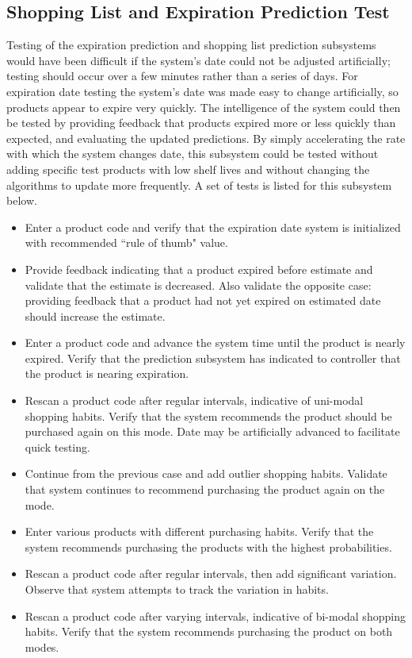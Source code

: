 \documentclass[11pt]{article} %
\begin{document}
\subsection{Shopping List and Expiration Prediction Test}
Testing of the expiration prediction and shopping list prediction subsystems would have been difficult if the system's date could not be adjusted artificially; testing should occur over a few minutes rather than a series of days. For expiration date testing the system's date was made easy to change artificially, so products appear to expire very quickly. The intelligence of the system could then be tested by providing feedback that products expired more or less quickly than expected, and evaluating the updated predictions. By simply accelerating the rate with which the system changes date, this subsystem could be tested without adding specific test products with low shelf lives and without changing the algorithms to update more frequently. A set of tests is listed for this subsystem below.
\begin{itemize}
\item Enter a product code and verify that the expiration date system is initialized with recommended ``rule of thumb" value.
\item Provide feedback indicating that a product expired before estimate and validate that the estimate is decreased. Also validate the opposite case: providing feedback that a product had not yet expired on estimated date should increase the estimate.
\item Enter a product code and advance the system time until the product is nearly expired. Verify that the prediction subsystem has indicated to controller that the product is nearing expiration.
\item Rescan a product code after regular intervals, indicative of uni-modal shopping habits. Verify that the system recommends the product should be purchased again on this mode. Date may be artificially advanced to facilitate quick testing.
\item Continue from the previous case and add outlier shopping habits. Validate that system continues to recommend purchasing the product again on the mode.
\item Enter various products with different purchasing habits. Verify that the system recommends purchasing the products with the highest probabilities.
\item Rescan a product code after regular intervals, then add significant variation. Observe that system attempts to track  the variation in habits.
\item Rescan a product code after varying intervals, indicative of bi-modal shopping habits. Verify that the system recommends purchasing the product on both modes.
\end{itemize}
\end{document}
